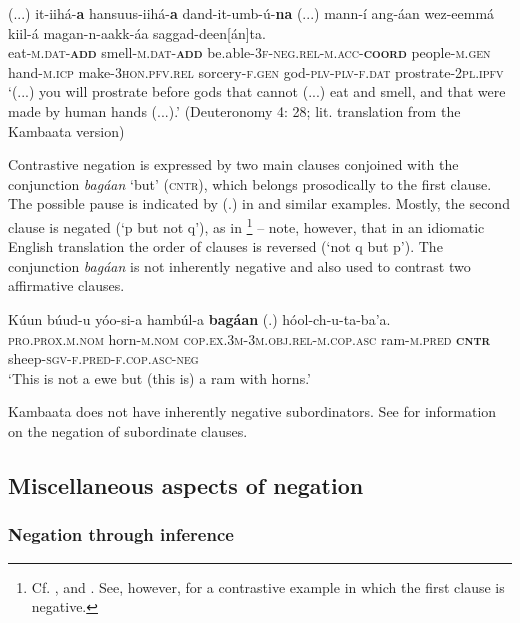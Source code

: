 \documentclass[output=paper,colorlinks,citecolor=brown,draftmode
]{langscibook}
\begin{document}
\ea\label{ex:treis:53} 
\gll (...) it-iihá-\textbf{a} hansuus-iihá-\textbf{a} dand-it-umb-ú\footnotemark{}-\textbf{na} (...) mann-í ang-áan wez-eemmá kiil-á magan-n-aakk-áa saggad-deen[án]ta.\\
{} eat-\textsc{m.dat-\textbf{add}} smell-\textsc{m.dat-\textbf{add}} be.able-\textsc{3f-neg.rel-m.acc-\textbf{coord}} {} people-\textsc{m.gen} hand-\textsc{m.icp} make-\textsc{3hon.pfv.rel} sorcery-\textsc{f.gen} god-\textsc{plv-plv-f.dat} prostrate-\textsc{2pl.ipfv} \\
\glt ‘(...) you will prostrate before gods that cannot (...) eat and smell, and that were made by human hands (...).’ (Deuteronomy 4: 28;  lit. translation from the Kambaata version) \citep{BibleSociety2023}
\z 
{}

Contrastive negation is expressed by two main clauses conjoined with the conjunction \textit{bagáan} ‘but’ (\textsc{cntr}), which belongs prosodically to the first clause. The possible pause is indicated by (.) in  and similar examples. Mostly, the second clause is negated (‘p but not q’), as in \footnote{Cf. , %
 and . See, however,  for a contrastive example in which the first clause is negative.} -- note, however, that in an idiomatic English translation the order of clauses is reversed (‘not q but p’). The conjunction \textit{bagáan} is not inherently negative and also used to contrast two affirmative clauses.

\ea\label{ex:treis:54} 
\gll Kúun búud-u yóo-si-a hambúl-a \textbf{bagáan} (.) hóol-ch-u-ta-ba'a.\\
\textsc{pro.prox.m.nom} horn-\textsc{m.nom} \textsc{cop.ex.3m-3m.obj.rel-m.cop.asc} ram-\textsc{m.pred} \textsc{\textbf{cntr}} {} sheep-\textsc{sgv-f.pred-f.cop.asc-neg}\\
\glt ‘This is not a ewe but (this is) a ram with horns.’ \citep[14]{Saint-Exupéry2018}
\z 

Kambaata does not have inherently negative subordinators. See  for information on the negation of subordinate clauses. 

\subsection{Miscellaneous aspects of negation}\label{sec:treis:4.6}
\subsubsection{Negation through inference}\label{sec:treis:4.6.1}
\end{document}
